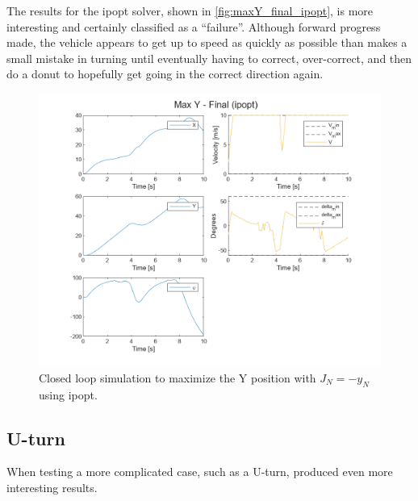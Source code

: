 \documentclass[]{IEEEtran}
\begin{document}
The results for the ipopt solver, shown in \autoref{fig:maxY_final_ipopt}, is more interesting and certainly classified as a ``failure''.
Although forward progress made, the vehicle appears to get up to speed as quickly as possible than makes a small mistake in turning until eventually having to correct, over-correct, and then do a donut to hopefully get going in the correct direction again.

\begin{figure}[h]
    \centering
    \includegraphics[width = \columnwidth]{figs/Max_Y_-_Final_(ipopt)_traj.png}
    \caption{Closed loop simulation to maximize the Y position with $J_N = -y_N$ using ipopt.}\label{fig:maxY_final_ipopt}
\end{figure}

\subsection{U-turn}
When testing a more complicated case, such as a U-turn, produced even more interesting results.
\end{document}
